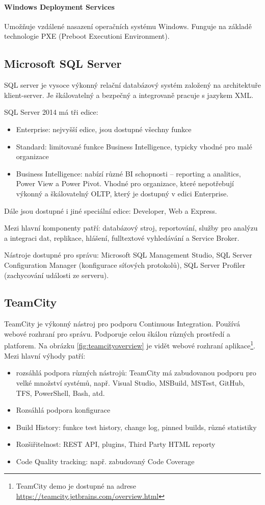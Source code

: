\paragraph{Windows Deployment Services} 
Umožňuje vzdálené nasazení operačních systému Windows. Funguje na základě technologie PXE (Preboot Executioni Environment). \cite{MasteringWindowsServer}

\subsection{Microsoft SQL Server}
SQL server je vysoce výkonný relační databázový systém založený na architektuře klient-server. Je škálovatelný a bezpečný a integrovaně pracuje s jazykem XML. 

SQL Server 2014 má tři edice:
\begin{itemize}
\item Enterprise: nejvyšší edice, jsou dostupné všechny funkce
\item Standard: limitované funkce Business Intelligence, typicky vhodné pro malé organizace
\item Business Intelligence: nabízí různé BI schopnosti -- reporting a analitics, Power View a Power Pivot. Vhodné pro organizace, které nepotřebují výkonný a škálovatelný OLTP, který je dostupný v edici Enterprise.
\end{itemize}

Dále jsou dostupné i jiné speciální edice: Developer, Web a Express.

Mezi hlavní komponenty patří: databázový stroj, reportování, služby pro analýzu a integraci dat, replikace, hlášení, fulltextové vyhledávání a Service Broker.

Nástroje dostupné pro správu: Microsoft SQL Management Studio, SQL Server Configuration Manager (konfigurace síťových protokolů), SQL Server Profiler (zachycování události ze serveru).  \cite{SqlServerIntro}

\subsection{TeamCity}
TeamCity je výkonný nástroj pro podporu Continuous Integration. Používá webové rozhraní pro správu. Podporuje celou škálou různých prostředí a platforem. Na obrázku \ref{fig:teamcityoverview} je vidět webové rozhraní aplikace\footnote{TeamCity demo je dostupné na adrese \url{https://teamcity.jetbrains.com/overview.html}}. Mezi hlavní výhody patří: 

\begin{itemize}
\item rozsáhlá podpora různých nástrojů: TeamCity má zabudovanou podporu pro velké množství systémů, např. Visual Studio, MSBuild, MSTest, GitHub, TFS, PowerShell, Bash, atd.
\item Rozsáhlá podpora konfigurace
\item Build History: funkce test history, change log, pinned builds, různé statistiky
\item Rozšiřitelnost: REST API, plugins, Third Party HTML reporty
\item Code Quality tracking: např. zabudovaný Code Coverage
\end{itemize}

